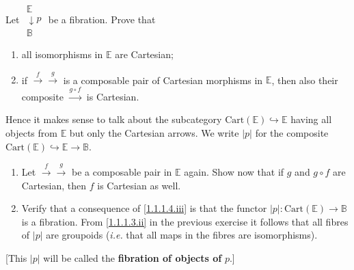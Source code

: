 \documentclass{report}
\newcommand{\bE}[0]{\mathbb E}
\newcommand{\bB}[0]{\mathbb B}
\newcommand{\fib}[3]{\begin{array}{l}#1 \\[-0.1cm] \downarrow #2 \\ #3\end{array}}
\newcommand{\fibPEB}[0]{\fib{\bE}{p}{\bB}}
\newcommand{\Cart}[0]{\mathrm{Cart}}
\begin{document}
\begin{exo}
    Let $\fibPEB$ be a fibration. Prove that
    \begin{enumerate}[label=(\roman*)]
        \item all isomorphisms in $\bE$ are Cartesian;
        \item\label{1.1.1.4.ii} if $\overset{f}{\rightarrow}\overset{g}{\rightarrow}$ is a composable
        pair of Cartesian morphisms in $\bE$, then also their composite $\overset{g\circ f}{\rightarrow}$ is Cartesian.
    \end{enumerate}
    Hence it makes sense to talk about the subcategory $\Cart(\bE)\hookrightarrow\bE$ having
    all objects from $\bE$ but only the Cartesian arrows. We write $|p|$ for the composite
    $\Cart(\bE)\hookrightarrow\bE \rightarrow \bB$.
    \begin{enumerate}[label=(\roman*)]
        \item\label{1.1.1.4.iii} Let $\overset{f}{\to}\overset{g}{\to}$ be a composable pair in $\bE$
        again. Show now that if $g$ and $g\circ f$ are Cartesian, then $f$ is Cartesian as well.
        \item Verify that a consequence of \ref{1.1.1.4.iii} is that the functor $|p| : \Cart(\bE) \to
        \bB$ is a fibration. From \ref{1.1.1.3.ii} in the previous exercise it follows that all
        fibres of $|p|$ are groupoids (\textit{i.e.} that all maps in the fibres are isomorphisms).
    \end{enumerate}
    [This $|p|$ will be called the \textbf{fibration of objects of} $p$.]
\end{exo}
\end{document}
